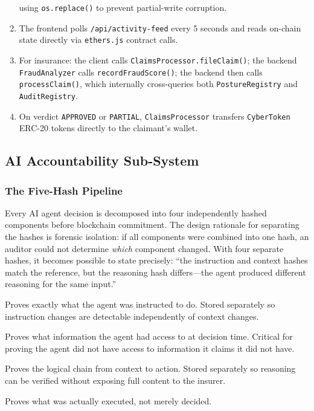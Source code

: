 \documentclass[12pt,a4paper]{article}
\begin{document}
\begin{enumerate}
        using \texttt{os.replace()} to prevent partial-write corruption.
  \item The frontend polls \texttt{/api/activity-feed} every 5 seconds
        and reads on-chain state directly via \texttt{ethers.js} contract calls.
  \item For insurance: the client calls \texttt{ClaimsProcessor.fileClaim()};
        the backend \texttt{FraudAnalyzer} calls \texttt{recordFraudScore()};
        the backend then calls \texttt{processClaim()}, which internally
        cross-queries both \texttt{PostureRegistry} and \texttt{AuditRegistry}.
  \item On verdict \texttt{APPROVED} or \texttt{PARTIAL},
        \texttt{ClaimsProcessor} transfers \texttt{CyberToken} ERC-20
        tokens directly to the claimant's wallet.
\end{enumerate}

\subsection{AI Accountability Sub-System}
\label{sec:ai-subsystem}

\subsubsection{The Five-Hash Pipeline}
\label{sec:fivehash}

Every AI agent decision is decomposed into four independently hashed
components before blockchain commitment. The design rationale for
separating the hashes is forensic isolation: if all components were
combined into one hash, an auditor could not determine \emph{which}
component changed. With four separate hashes, it becomes possible to
state precisely: ``the instruction and context hashes match the
reference, but the reasoning hash differs---the agent produced different
reasoning for the same input.''

\begin{description}[leftmargin=2em]
  \item[\textbf{Instruction Hash} \texttt{SHA256(prompt\_template)}:]
  Proves exactly what the agent was instructed to do. Stored separately
  so instruction changes are detectable independently of context changes.
  \item[\textbf{Context Hash} \texttt{SHA256(system\_context)}:]
  Proves what information the agent had access to at decision time.
  Critical for proving the agent did not have access to information it
  claims it did not have.
  \item[\textbf{Reasoning Hash} \texttt{SHA256(decision.reasoning)}:]
  Proves the logical chain from context to action. Stored separately so
  reasoning can be verified without exposing full content to the insurer.
  \item[\textbf{Action Hash} \texttt{SHA256(decision.action)}:]
  Proves what was actually executed, not merely decided.
\end{description}
\end{document}
